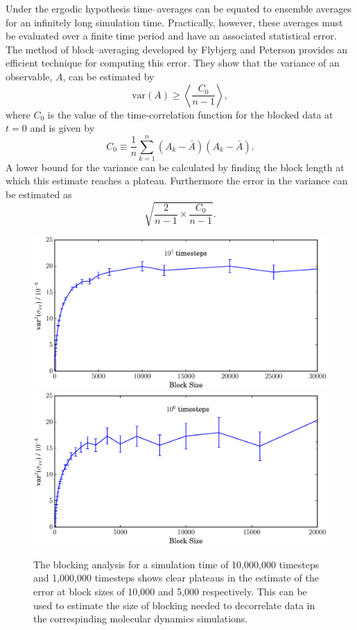 Under the ergodic hypothesis time--averages can be equated to ensemble averages for an infinitely long simulation time.\cite{Bopp2008}
Practically, however, these averages must be evaluated over a finite time period and have an associated statistical error.
The method of block--averaging developed by Flybjerg and Peterson provides an efficient technique for computing this error.\cite{Flyvbjerg1989}
They show that the variance of an observable, $A$, can be estimated by
\begin{equation}
\mathrm{var}(A) \geq \left< \frac{C_{0}}{n-1} \right>,
\end{equation}
where $C_{0}$ is the value of the time-correlation function for the blocked data at $t=0$ and is given by
\begin{equation}
C_{0} \equiv \frac{1}{n} \sum_{k=1}^{n}(A_{k} - \bar{A})(A_{k} - \bar{A}).
\end{equation}
A lower bound for the variance can be calculated by finding the block length at which this estimate reaches a plateau.
Furthermore the error in the variance can be estimated as 
\begin{equation}
\sqrt{\frac{2}{n-1} \times \frac{C_{0}}{n-1}}.
\end{equation}

\begin{figure}
\hspace{-4em}
        \includegraphics[scale=0.35]{block_average_10e6.eps}
        \includegraphics[scale=0.35]{block_average_1e6.eps}
	\caption{The blocking analysis for a simulation time of 10,000,000 timesteps and 1,000,000 timesteps shows clear plateaus in the estimate of the error at block sizes of 10,000 and 5,000 respectively.
This can be used to estimate the size of blocking needed to decorrelate data in the correspinding molecular dynamics simulations.}
\label{blocking}
\end{figure}

